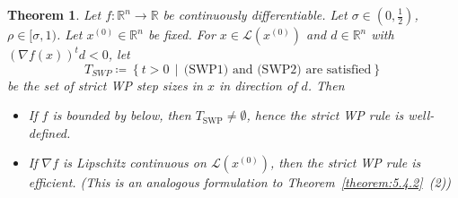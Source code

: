 \documentclass[a4paper]{article}
\newcounter{lecref}[subsection]
\numberwithin{lecref}{subsection}
\newtheorem{theorem}[lecref]{Theorem}
\newcommand{\SetDef}[2]{\left\{#1\,\mid\,#2\right\}}
\begin{document}
\begin{theorem}
	\label{theorem:5.4.3}
	Let $f: \mathbb R^n \to \mathbb R$ be continuously differentiable. Let $\sigma \in \left(0, \frac12\right)$, $\rho \in [\sigma, 1)$. Let $x^{(0)} \in \mathbb R^n$ be fixed.
	For $x \in \mathcal L(x^{(0)})$ and $d \in \mathbb R^n$ with $(\nabla f(x))^t d < 0$, let
	\[ T_{SWP} \coloneqq \SetDef{t > 0}{\text{(SWP1) and (SWP2) are satisfied}} \]
	be the set of strict WP step sizes in $x$ in direction of $d$. Then
	\begin{itemize}
		\item If $f$ is bounded by below, then $T_{\text{SWP}} \neq \emptyset$, hence the strict WP rule is well-defined.
		\item If $\nabla f$ is Lipschitz continuous on $\mathcal L(x^{(0)})$, then the strict WP rule is efficient. (This is an analogous formulation to Theorem~\ref{theorem:5.4.2}~(2))
	\end{itemize}
\end{theorem}
\end{document}
